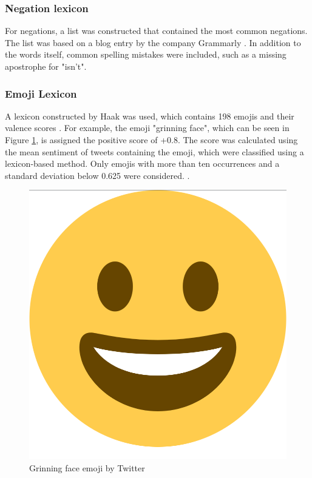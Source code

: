 \subsubsection{Negation lexicon}
For negations, a list was constructed that contained the most common negations. The list was based on a blog entry by the company Grammarly \cite{negations}. In addition to the words itself, common spelling mistakes were included, such as a missing apostrophe for "isn't".

\subsubsection{Emoji Lexicon}
A lexicon constructed by Haak was used, which contains 198 emojis and their valence scores \cite{haak_dataset}. For example, the emoji "grinning face", which can be seen in Figure \ref{fig:emoji}, is assigned the positive score of +0.8. The score was calculated using the mean sentiment of tweets containing the emoji, which were classified using a lexicon-based method. Only emojis with more than ten occurrences and a standard deviation below 0.625 were considered. \cite{haak_article}.

\begin{figure}
    \centering
    \includegraphics[scale=0.05]{Images/emoji_smile.png}
    \caption{Grinning face emoji by Twitter \cite{twitter:image}}
    \label{fig:emoji}
\end{figure}



